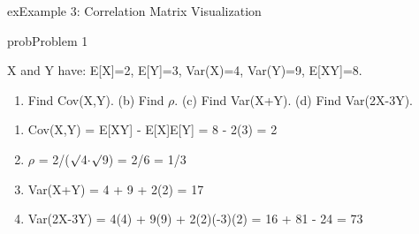 \begin{PSbox}[unbreakable]{ex}{Example 3: Correlation Matrix Visualization}
\begin{Shaded}
\begin{Highlighting}[]
\OperatorTok{;}
\NormalTok{(}\OperatorTok{,}\OperatorTok{,}\NormalTok{)}\OperatorTok{;} \NormalTok{(}\NormalTok{)}\OperatorTok{;} \OperatorTok{;}
\NormalTok{(}\NormalTok{)}\OperatorTok{;} \NormalTok{(}\NormalTok{)}\OperatorTok{;} \NormalTok{(}\NormalTok{)}\OperatorTok{;}
\NormalTok{(}\OperatorTok{,}\OperatorTok{,}\NormalTok{)}\OperatorTok{;} \NormalTok{(}\NormalTok{)}\OperatorTok{;} \OperatorTok{;}
\NormalTok{(}\NormalTok{)}\OperatorTok{;} \NormalTok{(}\NormalTok{)}\OperatorTok{;} \NormalTok{(}\NormalTok{)}\OperatorTok{;}
\end{Highlighting}
\end{Shaded}

\end{PSbox}


\begin{PSbox}[unbreakable]{prob}{Problem 1}

X and Y have: E[X]=2, E[Y]=3, Var(X)=4, Var(Y)=9, E[XY]=8.

\begin{enumerate}
\def\labelenumi{(\alph{enumi})}
\tightlist
\item
  Find Cov(X,Y). (b) Find \ensuremath{\rho}. (c) Find Var(X+Y). (d) Find Var(2X-3Y).
\end{enumerate}

\PSsolution{} 

\begin{enumerate}
\def\labelenumi{(\alph{enumi})}
\tightlist
\item
  Cov(X,Y) = E[XY] - E[X]E[Y] = 8 - 2(3) = 2
\item
  \ensuremath{\rho} = 2/(\ensuremath{\surd}4\ensuremath{\cdot}\ensuremath{\surd}9) = 2/6 = 1/3
\item
  Var(X+Y) = 4 + 9 + 2(2) = 17
\item
  Var(2X-3Y) = 4(4) + 9(9) + 2(2)(-3)(2) = 16 + 81 - 24 = 73
\end{enumerate}

\end{PSbox}

